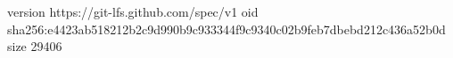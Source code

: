 version https://git-lfs.github.com/spec/v1
oid sha256:e4423ab518212b2c9d990b9c933344f9c9340c02b9feb7dbebd212c436a52b0d
size 29406
